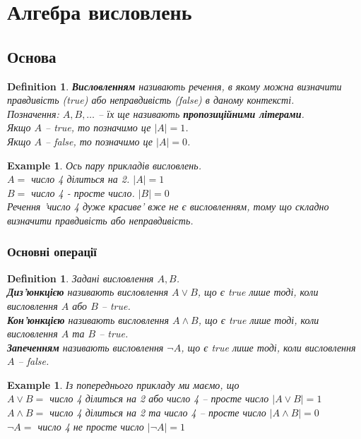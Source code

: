 \documentclass[a4paper, 14pt]{extarticle}
\theoremstyle{theoremdd}
\theoremstyle{theoremdd}
\newtheorem{definition}[theorem]{Definition}
\theoremstyle{theoremdd}
\theoremstyle{theoremdd}
\theoremstyle{theoremdd}
\newtheorem{example}[theorem]{Example}
\theoremstyle{theoremdd}
\theoremstyle{theoremdd}
\theoremstyle{theoremdd}
\theoremstyle{theoremdd}
\theoremstyle{theoremdd}
\theoremstyle{theoremdd}
\theoremstyle{theoremdd}
\theoremstyle{theoremdd}
\theoremstyle{theoremdd}
\theoremstyle{theoremdd}
\begin{document}
\tableofcontents
\newpage

\section{Алгебра висловлень}
\subsection{Основа}
\begin{definition}
\textbf{Висловленням} називають речення, в якому можна визначити правдивість (true) або неправдивість (false) в даному контексті.\\
Позначення: $A,B,\dots$ -- їх ще 
називають \textbf{пропозиційними літерами}.
\bigskip \\
Якщо $A$ -- true, то позначимо це $|A| = 1$.\\
Якщо $A$ -- false, то позначимо це $|A| = 0$.
\end{definition}

\begin{example} Ось пару прикладів висловлень.\\
$A = $ число 4 ділиться на 2. $|A|=1$\\
$B = $ число 4 - просте число. $|B|=0$
\bigskip
\\
Речення 'число 4 дуже красиве' вже не є висловленням, тому що складно визначити правдивість або неправдивість.
\end{example}

\subsubsection*{Основні операції}
\begin{definition}
Задані висловлення $A,B$.\\
\textbf{Диз'юнкцією} називають висловлення $A \vee B$, що є true лише тоді, коли висловлення $A$ \textit{або} $B$ -- true.\\
\textbf{Кон'юнкцією} називають висловлення $A \wedge B$, що є true лише тоді, коли висловлення $A$ \textit{та} $B$ -- true.\\
\textbf{Запеченням} називають висловлення $\neg A$, що є true лише тоді, коли висловлення $A$ -- false.
\end{definition}

\begin{example} Із попереднього прикладу ми маємо, що\\
$A \vee B =$ число 4 ділиться на 2 або число 4 -- просте число \hspace{0.5cm} $|A \vee B| = 1$\\
$A \wedge B = $ число 4 ділиться на 2 та число 4 -- просте число \hspace{0.6cm} $|A \wedge B| = 0$\\
$\neg A =$ число 4 не просте число \hspace{6.4cm} $|\neg A| = 1$
\end{example}
\end{document}
